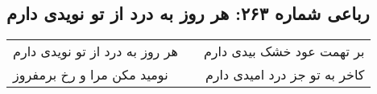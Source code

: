\begin{center}
\section*{رباعی شماره ۲۶۳: هر روز به درد از تو نویدی دارم}
\label{sec:sh263}
\begin{longtable}{l p{0.5cm} r}
هر روز به درد از تو نویدی دارم
&&
بر تهمت عود خشک بیدی دارم
\\
نومید مکن مرا و رخ برمفروز
&&
کاخر به تو جز درد امیدی دارم
\\
\end{longtable}
\end{center}
